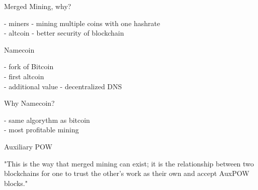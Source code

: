 \documentclass{beamer}
\begin{document}
\begin{frame}

    {\LARGE Merged Mining, why?}\\

    \vspace{5mm}

    - miners - mining multiple coins with one hashrate\\
    - altcoin - better security of blockchain\\

\end{frame}

\begin{frame}

    {\LARGE Namecoin}\\

    \vspace{5mm}

    - fork of Bitcoin\\
    - first altcoin\\
    - additional value - decentralized DNS\\

    \vspace{7mm}

    {\LARGE Why Namecoin?}\\

    \vspace{5mm}

    - same algorythm as bitcoin\\
    - most profitable mining\\

\end{frame}

\begin{frame}

    {\LARGE Auxiliary POW}\\

    \vspace{5mm}

    "This is the way that merged mining can exist; it is the relationship between two blockchains for one to trust the other's work as their own and accept AuxPOW blocks."\\

\end{frame}
\end{document}
